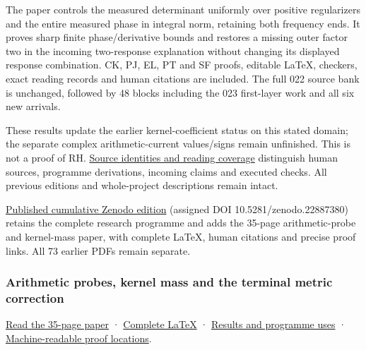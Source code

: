 \documentclass[
]{article}
\begin{document}
The paper controls the measured determinant uniformly over positive
regularizers and the entire measured phase in integral norm, retaining
both frequency ends. It proves sharp finite phase/derivative bounds and
restores a missing outer factor two in the incoming two-response
explanation without changing its displayed response combination. CK, PJ,
EL, PT and SF proofs, editable LaTeX, checkers, exact reading records
and human citations are included. The full 022 source bank is unchanged,
followed by 48 blocks including the 023 first-layer work and all six new
arrivals.

These results update the earlier kernel-coefficient status on this
stated domain; the separate complex arithmetic-current values/signs
remain unfinished. This is not a proof of RH.
\href{https://github.com/KokunoYumeto/zeta-function-research-reader/blob/main/workbenches/splitzero-tandem/continuations/20260922-kernel-frequency/SOURCE_READING_USE_LEDGER.json}{Source
identities and reading coverage} distinguish human sources, programme
derivations, incoming claims and executed checks. All previous editions
and whole-project descriptions remain intact.

\href{https://zenodo.org/records/22887380}{Published cumulative Zenodo
edition} (assigned DOI 10.5281/zenodo.22887380) retains the complete
research programme and adds the 35-page arithmetic-probe and kernel-mass
paper, with complete LaTeX, human citations and precise proof links. All
73 earlier PDFs remain separate.

\subsubsection{Arithmetic probes, kernel mass and the terminal metric
correction}\label{arithmetic-probes-kernel-mass-and-the-terminal-metric-correction}

\href{https://github.com/KokunoYumeto/zeta-function-research-reader/blob/main/workbenches/splitzero-tandem/continuations/20260922-arithmetic-probe-mass/ARITHMETIC_PROBE_MASS_READER.pdf}{Read
the 35-page paper} ·
\href{https://github.com/KokunoYumeto/zeta-function-research-reader/blob/main/workbenches/splitzero-tandem/continuations/20260922-arithmetic-probe-mass/ARITHMETIC_PROBE_MASS_READER.tex}{Complete
LaTeX} ·
\href{https://github.com/KokunoYumeto/zeta-function-research-reader/blob/main/workbenches/splitzero-tandem/continuations/20260922-arithmetic-probe-mass/RESULTS_20260922_022.md}{Results
and programme uses} ·
\href{https://github.com/KokunoYumeto/zeta-function-research-reader/blob/main/workbenches/splitzero-tandem/continuations/20260922-arithmetic-probe-mass/RESULT_INDEX.json}{Machine-readable
proof locations}.
\end{document}
